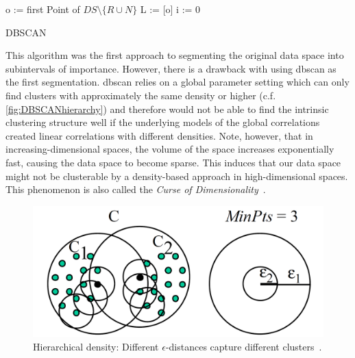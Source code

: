\vspace{5mm}
\begin{algorithm}[H]
\SetAlgoLined
{}
 o := first Point of $DS\setminus \{R \cup N\}$\;
 L := [o]\;
 i := 0\;
 \caption{DBSCAN}
\end{algorithm}
\vspace{5mm}

This algorithm was the first approach to segmenting the original data space into subintervals of importance. However, there is a drawback with using \gls{dbscan} as the first segmentation. \gls{dbscan} relies on a global parameter setting which can only find clusters with approximately the same density or higher (c.f. \autoref{fig:DBSCANhierarchy}) and therefore would not be able to find the intrinsic clustering structure well if the underlying models of the global correlations created linear correlations with different densities. 
Note, however, that in increasing-dimensional spaces, the volume of the space increases exponentially fast, causing the data space to become sparse. This induces that our data space might not be clusterable by a density-based approach in high-dimensional spaces. This phenomenon is also called the \textit{Curse of Dimensionality}~\cite{bellman2015adaptive}.

\begin{figure}
    \centering
    \includegraphics[width=.5\textwidth]{figures/DBSCANleastdensity.png}
    \caption{Hierarchical density: Different $\epsilon$-distances capture different clusters~\cite{opticsankerst1999optics}.}
    \label{fig:DBSCANhierarchy}
\end{figure}

